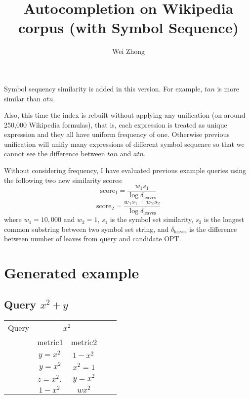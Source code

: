 \documentclass[12pt]{article} %
\begin{document}
\title{Autocompletion on Wikipedia corpus (with Symbol Sequence)}
\author{Wei Zhong}
\maketitle

Symbol sequency similarity is added in this version.
For example, $tan$ is more similar than $atn$.

Also, this time the index is rebuilt without applying any unification (on around 250,000 Wikipedia formulas), that is, each expression is treated as unique expression and they all have uniform frequency of one.
Otherwise previous unification will unifiy many expressions of different symbol sequence so that we cannot see the difference between $tan$ and $atn$.

Without considering frequency, I have evaluated previous example queries using the following two new similarity scores:
$$
\text{score}_1 = \frac{w_1 s_1}{\log \delta_{\text{leaves}}}
$$
$$
\text{score}_2 = \frac{w_1 s_1 + w_2 s_2}{\log \delta_{\text{leaves}}}
$$
where $w_1 = 10,000$ and $w_2 = 1$, $s_1$ is the symbol set similarity, $s_2$ is the longest common substring between two symbol set string, and $\delta_{\text{leaves}}$ is the difference between number of leaves from query and candidate OPT.

\pagebreak
\section*{Generated example}

\subsection{Query $x^2+y$}
\begin{center}
\begin{tabular}{lcccc}
Query  & \multicolumn{2}{c}{ $x^2$ } \\ & metric1 & metric2 \\
\hline
 &  $    y=x^{2}\,                    $ & $      1-x^{2}\,                     $ \\
 &  $   y=x^{2}                       $ & $     x^{2}=1                            $ \\
 &  $   z=x^{2}.\,                    $ & $      y=x^{2}                          $ \\
 &  $   1-x^{2}\,                     $ & $     wx^{2}                               $ \\
\end{tabular}
\end{center}
\end{document}
